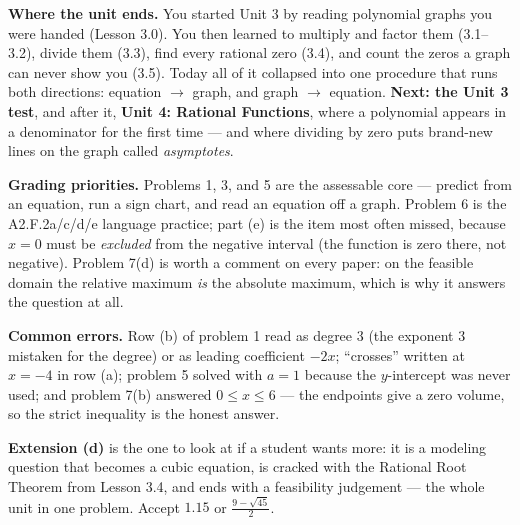 \documentclass[10pt]{article}
\begin{document}
\begin{spiralbox}
\textbf{Where the unit ends.} You started Unit 3 by reading polynomial graphs you were handed
(Lesson 3.0). You then learned to multiply and factor them (3.1--3.2), divide them (3.3), find every
rational zero (3.4), and count the zeros a graph can never show you (3.5). Today all of it collapsed
into one procedure that runs both directions: equation $\rightarrow$ graph, and graph $\rightarrow$
equation. \textbf{Next: the Unit 3 test}, and after it, \textbf{Unit 4: Rational Functions}, where a
polynomial appears in a denominator for the first time --- and where dividing by zero puts brand-new
lines on the graph called \emph{asymptotes}.
\end{spiralbox}

\begin{teachernote}
\textbf{Grading priorities.} Problems 1, 3, and 5 are the assessable core --- predict from an
equation, run a sign chart, and read an equation off a graph. Problem 6 is the A2.F.2a/c/d/e language
practice; part (e) is the item most often missed, because $x=0$ must be \emph{excluded} from the
negative interval (the function is zero there, not negative). Problem 7(d) is worth a comment on
every paper: on the feasible domain the relative maximum \emph{is} the absolute maximum, which is why
it answers the question at all.

\vspace{3pt}
\textbf{Common errors.} Row (b) of problem 1 read as degree $3$ (the exponent $3$ mistaken for the
degree) or as leading coefficient $-2x$; ``crosses'' written at $x=-4$ in row (a); problem 5 solved
with $a=1$ because the $y$-intercept was never used; and problem 7(b) answered $0 \le x \le 6$ ---
the endpoints give a zero volume, so the strict inequality is the honest answer.

\vspace{3pt}
\textbf{Extension (d)} is the one to look at if a student wants more: it is a modeling question that
becomes a cubic equation, is cracked with the Rational Root Theorem from Lesson 3.4, and ends with a
feasibility judgement --- the whole unit in one problem. Accept $1.15$ or $\frac{9-\sqrt{45}}{2}$.
\end{teachernote}
\end{document}
